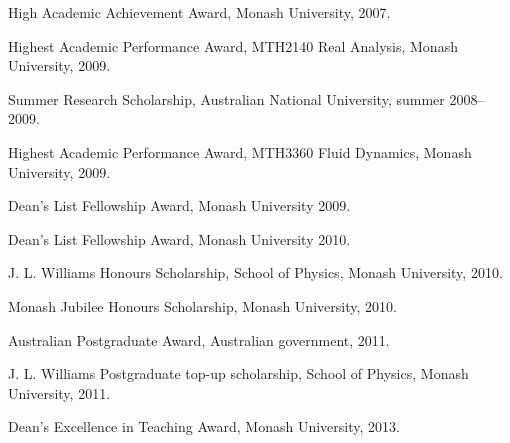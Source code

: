 \documentclass[10pt,letterpaper]{article}
\renewenvironment{itemize}{
  \begin{list}{}{
    \setlength{\leftmargin}{1.5em}
    \setlength{\itemsep}{0.25em}
    \setlength{\parskip}{0pt}
    \setlength{\parsep}{0.25em}
  }
}{
  \end{list}
}
\begin{document}
\begin{itemize}
\item High Academic Achievement Award, Monash University, 2007.
\item Highest Academic Performance Award, MTH2140 Real Analysis, Monash University, 2009.
\item Summer Research Scholarship, Australian National University, summer 2008--2009.
\item Highest Academic Performance Award, MTH3360 Fluid Dynamics, Monash University, 2009.
\item Dean's List Fellowship Award, Monash University 2009.
\item Dean's List Fellowship Award, Monash University 2010.
\item J. L. Williams Honours Scholarship, School of Physics, Monash University, 2010.
\item Monash Jubilee Honours Scholarship, Monash University, 2010.
\item Australian Postgraduate Award, Australian government, 2011.
\item J. L. Williams Postgraduate top-up scholarship, School of Physics, Monash University, 2011.
\item Dean's Excellence in Teaching Award, Monash University, 2013.
\end{itemize}
\end{document}
